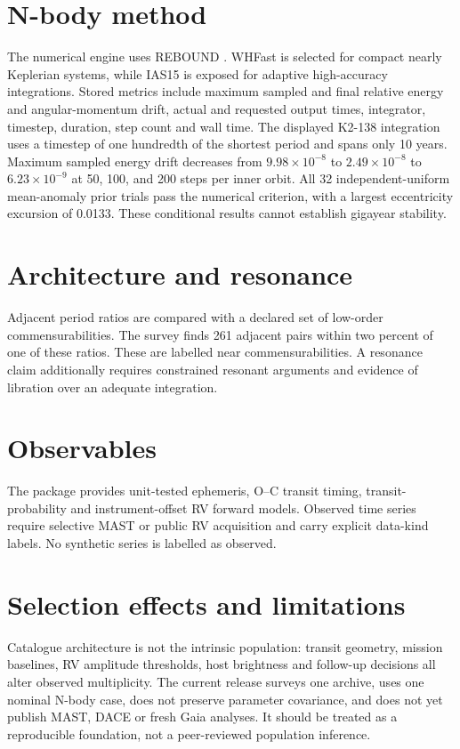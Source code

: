\documentclass[twocolumn]{aastex631}
\begin{document}
\section{N-body method}
The numerical engine uses REBOUND \citep{rein2012rebound}. WHFast \citep{rein2015whfast} is selected for compact nearly Keplerian systems, while IAS15 \citep{rein2015ias15} is exposed for adaptive high-accuracy integrations. Stored metrics include maximum sampled and final relative energy and angular-momentum drift, actual and requested output times, integrator, timestep, duration, step count and wall time. The displayed K2-138 integration uses a timestep of one hundredth of the shortest period and spans only 10 years. Maximum sampled energy drift decreases from $9.98\times10^{-8}$ to $2.49\times10^{-8}$ to $6.23\times10^{-9}$ at 50, 100, and 200 steps per inner orbit. All 32 independent-uniform mean-anomaly prior trials pass the numerical criterion, with a largest eccentricity excursion of 0.0133. These conditional results cannot establish gigayear stability.

\section{Architecture and resonance}
Adjacent period ratios are compared with a declared set of low-order commensurabilities. The survey finds 261 adjacent pairs within two percent of one of these ratios. These are labelled near commensurabilities. A resonance claim additionally requires constrained resonant arguments and evidence of libration over an adequate integration.

\section{Observables}
The package provides unit-tested ephemeris, O--C transit timing, transit-probability and instrument-offset RV forward models. Observed time series require selective MAST or public RV acquisition and carry explicit data-kind labels. No synthetic series is labelled as observed.

\section{Selection effects and limitations}
Catalogue architecture is not the intrinsic population: transit geometry, mission baselines, RV amplitude thresholds, host brightness and follow-up decisions all alter observed multiplicity. The current release surveys one archive, uses one nominal N-body case, does not preserve parameter covariance, and does not yet publish MAST, DACE or fresh Gaia analyses. It should be treated as a reproducible foundation, not a peer-reviewed population inference.
\end{document}
